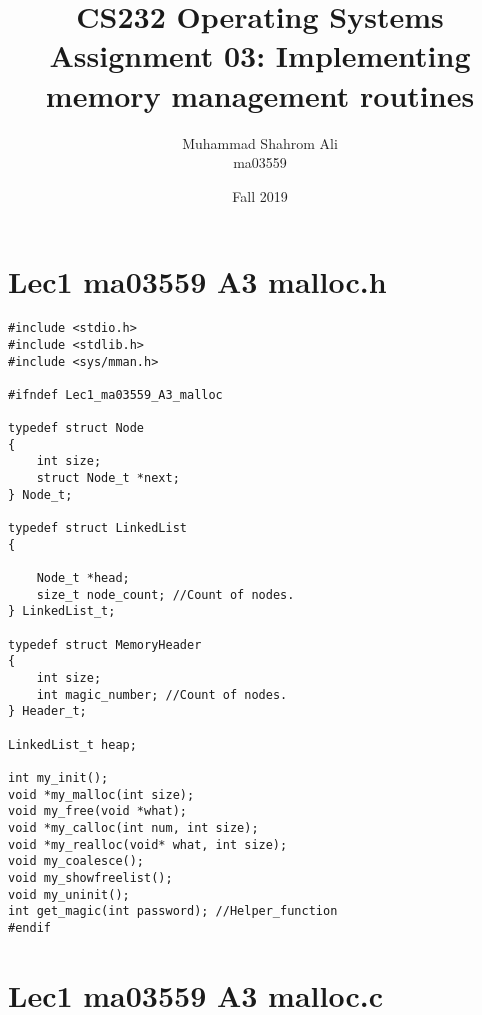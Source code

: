 \documentclass[a4paper]{article}
\begin{document}
\title{CS232 Operating Systems \\ Assignment 03: Implementing memory management routines}
\author{Muhammad Shahrom Ali \\ma03559}
\date{Fall 2019}
\maketitle


\section*{Lec1 ma03559 A3 malloc.h}

\begin{verbatim}
#include <stdio.h>
#include <stdlib.h>
#include <sys/mman.h>

#ifndef Lec1_ma03559_A3_malloc

typedef struct Node
{	
	int size;
	struct Node_t *next;
} Node_t;

typedef struct LinkedList
{
	
	Node_t *head;
	size_t node_count; //Count of nodes.
} LinkedList_t;

typedef struct MemoryHeader
{
	int size;
	int magic_number; //Count of nodes.
} Header_t;

LinkedList_t heap; 

int my_init();
void *my_malloc(int size);
void my_free(void *what);
void *my_calloc(int num, int size);
void *my_realloc(void* what, int size);
void my_coalesce();
void my_showfreelist();
void my_uninit();
int get_magic(int password); //Helper_function
#endif

\end{verbatim}

\section*{Lec1 ma03559 A3 malloc.c}
\end{document}
